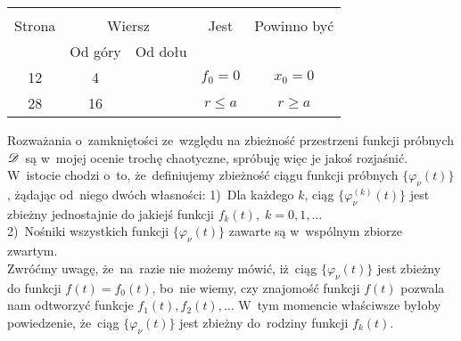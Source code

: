 \documentclass[a4paper,11pt]{article}
\begin{document}
\vspace{\spaceTwo}














\begin{center}

  \begin{tabular}{|c|c|c|c|c|}
    \hline
    & \multicolumn{2}{c|}{} & & \\
    Strona & \multicolumn{2}{c|}{Wiersz} & Jest
                              & Powinno być \\ \cline{2-3}
    & Od góry & Od dołu & & \\
    \hline
    12  &  4 & & $f_{ 0 } = 0$ & $x_{ 0 } = 0$ \\
    28  & 16 & & $r \leq a$ & $r \geq a$ \\
    \hline
  \end{tabular}

\end{center}

\vspace{\spaceTwo}










\newpage





\start \Str{} Rozważania o~zamkniętości ze~względu na zbieżność
przestrzeni funkcji próbnych $\mathcal{D}$~są w~mojej ocenie trochę
chaotyczne, spróbuję więc je jakoś rozjaśnić. W~istocie chodzi o~to,
że~definiujemy zbieżność ciągu funkcji próbnych
$\{ \varphi_{ \nu }( t ) \}$, żądając od~niego dwóch własności:
1)~Dla każdego $k$, ciąg $\{ \varphi_{ \nu }^{ ( k ) }( t ) \}$ jest
zbieżny jednostajnie do jakiejś funkcji
$f_{ k }( t ), \; k = 0, 1, \ldots$ \\
2)~Nośniki wszystkich funkcji $\{ \varphi_{ \nu }( t ) \}$ zawarte są
w~wspólnym zbiorze zwartym. \\
Zwróćmy uwagę, że~na~razie nie możemy mówić, iż~ciąg
$\{ \varphi_{ \nu }( t ) \}$ jest zbieżny do funkcji
$f( t ) = f_{ 0 }( t )$, bo~nie wiemy, czy znajomość funkcji $f( t )$
pozwala nam odtworzyć funkcje $f_{ 1 }( t ), f_{ 2 }( t ), \ldots$ W~tym
momencie właściwsze byłoby powiedzenie, że~ciąg
$\{ \varphi_{ \nu }( t ) \}$ jest zbieżny do~rodziny funkcji
$f_{ k }( t )$.
\end{document}

